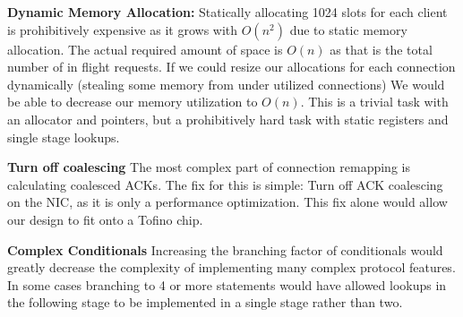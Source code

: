 \textbf{Dynamic Memory Allocation:}
Statically allocating 1024 slots for each client is prohibitively expensive as
it grows with $O(n^2)$ due to static memory allocation. The actual required
amount of space is $O(n)$ as that is the total number of in flight requests. If
we could resize our allocations for each connection dynamically (stealing some
memory from under utilized connections) We would be able to decrease our memory
utilization to $O(n)$. This is a trivial task with an allocator and pointers, but
a prohibitively hard task with static registers and single stage lookups.

\textbf{Turn off coalescing} The most complex part of connection remapping is
calculating coalesced ACKs. The fix for this is simple: Turn off ACK coalescing
on the NIC, as it is only a performance optimization. This fix alone would allow
our design to fit onto a Tofino chip.

\textbf{Complex Conditionals} Increasing the branching factor of conditionals
would greatly decrease the complexity of implementing many complex protocol
features. In some cases branching to 4 or more statements would have allowed
lookups in the following stage to be implemented in a single stage rather than
two.








